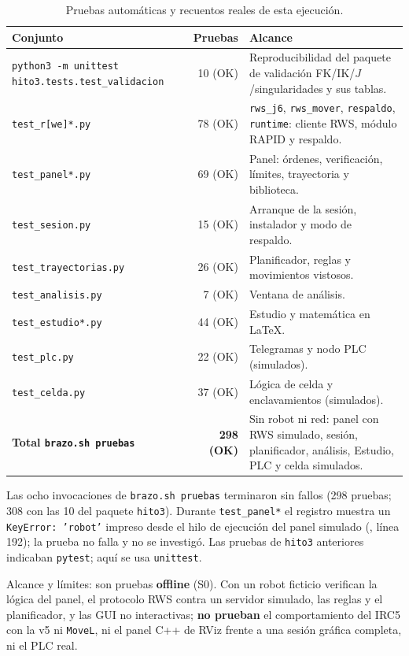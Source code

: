 \documentclass[10pt,a4paper]{article}
\DeclareRobustCommand{\ruta}[1]{\path{#1}}
\begin{document}
\begin{table}[H]
\centering\small
\renewcommand{\arraystretch}{1.15}
\begin{tabularx}{\textwidth}{@{}>{\raggedright\arraybackslash}p{5.2cm}rX@{}}
\toprule
\textbf{Conjunto} & \textbf{Pruebas} & \textbf{Alcance}\\
\midrule
\texttt{python3 -m unittest hito3.tests.test\_validacion} & 10 (OK) & Reproducibilidad del paquete de validación FK/IK/$J$/singularidades y sus tablas.\\
\texttt{test\_r[we]*.py} & 78 (OK) & \texttt{rws\_j6}, \texttt{rws\_mover}, \texttt{respaldo}, \texttt{runtime}: cliente RWS, módulo RAPID y respaldo.\\
\texttt{test\_panel*.py} & 69 (OK) & Panel: órdenes, verificación, límites, trayectoria y biblioteca.\\
\texttt{test\_sesion.py} & 15 (OK) & Arranque de la sesión, instalador y modo de respaldo.\\
\texttt{test\_trayectorias.py} & 26 (OK) & Planificador, reglas y movimientos vistosos.\\
\texttt{test\_analisis.py} & 7 (OK) & Ventana de análisis.\\
\texttt{test\_estudio*.py} & 44 (OK) & Estudio y matemática en \LaTeX.\\
\texttt{test\_plc.py} & 22 (OK) & Telegramas y nodo PLC (simulados).\\
\texttt{test\_celda.py} & 37 (OK) & Lógica de celda y enclavamientos (simulados).\\
\midrule
\textbf{Total \texttt{brazo.sh pruebas}} & \textbf{298 (OK)} & Sin robot ni red: panel con RWS simulado, sesión, planificador, análisis, Estudio, PLC y celda simulados.\\
\bottomrule
\end{tabularx}
\caption{Pruebas automáticas y recuentos reales de esta ejecución.}
\label{tab:pruebas}
\end{table}

Las ocho invocaciones de \texttt{brazo.sh pruebas} terminaron sin fallos (298 pruebas; 308 con las 10 del paquete \texttt{hito3}). Durante \texttt{test\_panel*} el registro muestra un \texttt{KeyError: 'robot'} impreso desde el hilo de ejecución del panel simulado (\ruta{panel/estado.py}, línea 192); la prueba no falla y no se investigó. Las pruebas de \texttt{hito3} anteriores indicaban \texttt{pytest}; aquí se usa \texttt{unittest}.

Alcance y límites: son pruebas \textbf{offline} (S0). Con un robot ficticio verifican la lógica del panel, el protocolo RWS contra un servidor simulado, las reglas y el planificador, y las GUI no interactivas; \textbf{no prueban} el comportamiento del IRC5 con la v5 ni \texttt{MoveL}, ni el panel C++ de RViz frente a una sesión gráfica completa, ni el PLC real.
\end{document}
